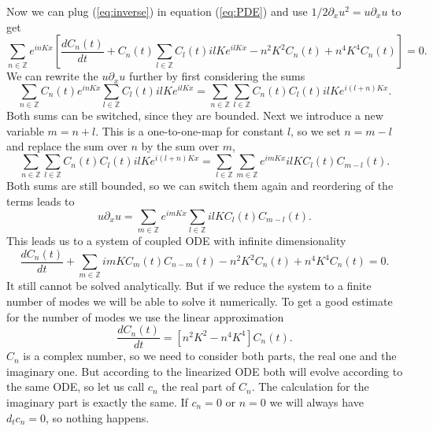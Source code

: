 Now we can plug (\ref{eq:inverse}) in equation (\ref{eq:PDE}) and use $1/2 \partial_x u^2 = u \partial_x u$ to get
\begin{equation}
  \sum_{n \in \mathbb{Z}} e^{in K x} \left[ \frac{d C_n(t)}{dt} + C_n(t) \sum_{l \in \mathbb{Z}} C_l(t) i l K e^{il K x} - n^2 K^2 C_n(t) + n^4 K^4 C_n(t) \right] = 0.
\end{equation}
We can rewrite the $u \partial_x u$ further by first considering the sums
\begin{equation}
  \sum_{n \in \mathbb{Z}} C_n(t)  e^{in K x} \sum_{l \in \mathbb{Z}} C_l(t) i l K e^{il K x} = \sum_{n \in \mathbb{Z}} \sum_{l \in \mathbb{Z}} C_n(t) C_l(t) i l K e^{i (l+n) K x}.
\end{equation}
Both sums can be switched, since they are bounded.
Next we introduce a new variable $m = n + l$.
This is a one-to-one-map for constant $l$, so we set $n = m - l$ and replace the sum over $n$ by the sum over $m$,
\begin{equation}
  \sum_{n \in \mathbb{Z}} \sum_{l \in \mathbb{Z}} C_n(t) C_l(t) i l K e^{i (l+n) K x} = \sum_{l \in \mathbb{Z}} \sum_{m \in \mathbb{Z}} e^{i m K x} i l K C_l(t) C_{m - l}(t).
\end{equation}
Both sums are still bounded, so we can switch them again and reordering of the terms leads to
\begin{equation}
  u \partial_x u =  \sum_{m \in \mathbb{Z}} e^{i m K x} \sum_{l \in \mathbb{Z}} i l K C_l(t) C_{m - l}(t).
\end{equation}
This leads us to a system of coupled ODE with infinite dimensionality
\begin{equation}
  \frac{d C_n(t)}{dt} + \sum_{m \in \mathbb{Z}} i m K C_m(t) C_{n - m}(t) -
  n^2 K^2 C_n(t) + n^4 K^4 C_n(t) = 0. \label{eq:ODE}
\end{equation}
It still cannot be solved analytically.
But if we reduce the system to a finite number of modes we will be able to solve it numerically.
To get a good estimate for the number of modes we use the linear approximation
\begin{equation}
  \frac{d C_n(t)}{dt} = \left[ n^2 K^2 - n^4 K^4 \right] C_n(t).
\end{equation}
$C_n$ is a complex number, so we need to consider both parts, the real one and the imaginary one.
But according to the linearized ODE both will evolve according to the same ODE, so let us call $c_n$ the real part of $C_n$.
The calculation for the imaginary part is exactly the same.
If $c_n = 0$ or $n = 0$ we will always have $d_t c_n = 0$, so nothing happens.

